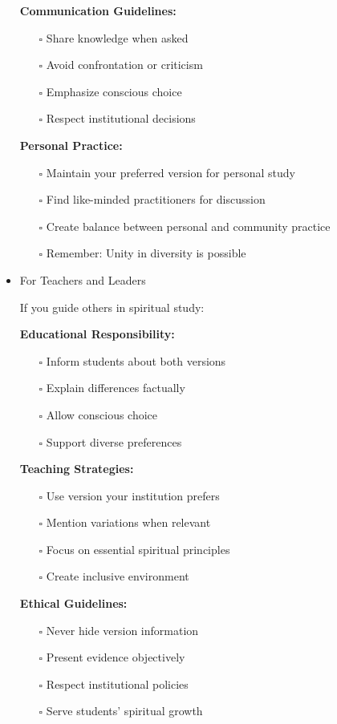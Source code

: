 \documentclass[11pt,twoside]{book}
\begin{document}
\begin{itemize}
\textbf{\textbf{Communication Guidelines:}}
\begin{itemize}
\item[{$\square$}] Share knowledge when asked
\item[{$\square$}] Avoid confrontation or criticism
\item[{$\square$}] Emphasize conscious choice
\item[{$\square$}] Respect institutional decisions
\end{itemize}

\textbf{\textbf{Personal Practice:}}
\begin{itemize}
\item[{$\square$}] Maintain your preferred version for personal study
\item[{$\square$}] Find like-minded practitioners for discussion
\item[{$\square$}] Create balance between personal and community practice
\item[{$\square$}] Remember: Unity in diversity is possible
\end{itemize}
\item For Teachers and Leaders
\label{sec:org6ab741f}

If you guide others in spiritual study:

\textbf{\textbf{Educational Responsibility:}}
\begin{itemize}
\item[{$\square$}] Inform students about both versions
\item[{$\square$}] Explain differences factually
\item[{$\square$}] Allow conscious choice
\item[{$\square$}] Support diverse preferences
\end{itemize}

\textbf{\textbf{Teaching Strategies:}}
\begin{itemize}
\item[{$\square$}] Use version your institution prefers
\item[{$\square$}] Mention variations when relevant
\item[{$\square$}] Focus on essential spiritual principles
\item[{$\square$}] Create inclusive environment
\end{itemize}

\textbf{\textbf{Ethical Guidelines:}}
\begin{itemize}
\item[{$\square$}] Never hide version information
\item[{$\square$}] Present evidence objectively
\item[{$\square$}] Respect institutional policies
\item[{$\square$}] Serve students' spiritual growth
\end{itemize}
\end{itemize}
\end{document}
